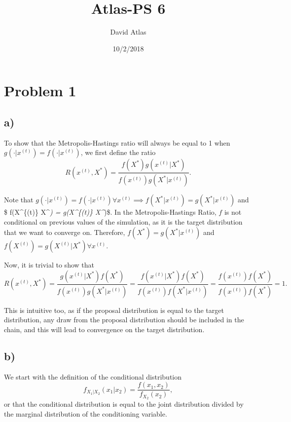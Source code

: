 \documentclass[]{article}
\title{Atlas-PS 6}
\author{David Atlas}
\date{10/2/2018}
\begin{document}
\maketitle

\newcommand{\Z}[1]{\left(\frac{x_{#1} - \mu_{#1}}{\sigma_{#1}} \right)}






\section{Problem 1}\label{problem-1}

\subsection{a)}\label{a}

To show that the Metropolis-Hastings ratio will always be equal to 1
when \(g(\cdot \vert x^{(t)}) = f(\cdot \vert x^{(t)})\), we first
define the ratio \[
R(x^{(t)}, X^*)=\frac{f(X^*) g(x^{(t)} \vert X^*)}{f(x^{(t)}) g(X^*|x^{(t)})}.
\]

Note that
\(g(\cdot \vert x^{(t)}) = f(\cdot \vert x^{(t)}) \forall x^{(t)} \implies f(X^*|x^{(t)}) = g(X^*|x^{(t)})\)
and \$ f(X\^{}\{(t)\} \textbar{} X\^{}\emph{) = g(X\^{}\{(t)\}
\textbar{} X\^{}})\$. In the Metropolis-Hastings Ratio, \(f\) is not
conditional on previous values of the simulation, as it is the target
distribution that we want to converge on. Therefore,
\(f(X^*) = g(X^*|x^{(t)})\) and
\(f(X^{(t)}) = g(X^{(t)} | X^*) \forall x^{(t)}\).

Now, it is trivial to show that \[
R(x^{(t)}, X^*)=\frac{g(x^{(t)} \vert X^*) f(X^*) }{f(x^{(t)}) g(X^*|x^{(t)})} = \frac{f(x^{(t)} \vert X^*) f(X^*) }{f(x^{(t)}) f(X^*|x^{(t)})} =  \frac{f(x^{(t)}) f(X^*) }{f(x^{(t)}) f(X^*)} = 1.
\]

This is intuitive too, as if the proposal distribution is equal to the
target distribution, any draw from the proposal distribution should be
included in the chain, and this will lead to convergence on the target
distribution.

\subsection{b)}\label{b}

We start with the definition of the conditional distribution \[
f_{X_1 | X_2}(x_1 | x_2) = \frac{f(x_1, x_2)}{f_{X_2}(x_2)},
\] or that the conditional distribution is equal to the joint
distribution divided by the marginal distribution of the conditioning
variable.
\end{document}
